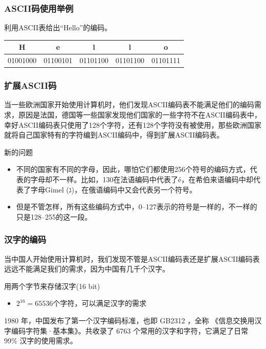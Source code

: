 \begin{frame}[t]
    \frametitle{ASCII码使用举例}
    \begin{question}
        利用ASCII表给出“Hello”的编码。
    \end{question}
    \pause
    \begin{table}
        \centering
        \begin{tabular}{|c|c|c|c|c|}
            \bottomrule
           H & e & l & l & o \\ \hline
           01001000 & 01100101 & 01101100  & 01101100 & 01101111 \\ \toprule
        \end{tabular}
    \end{table}
\end{frame}

\begin{frame}
    \frametitle{扩展ASCII码}
    当一些欧洲国家开始使用计算机时，他们发现ASCII编码表不能满足他们的编码需求，原因是法国，德国等一些国家发现他们国家的一些字符不在ASCII编码表中，幸好ASCII编码表只使用了128个字符，还有128个字符没有被使用，那些欧洲国家就将自己国家特有的字符编到ASCII编码中，得到扩展ASCII编码表。

    \notice 新的问题
    
    \begin{itemize}
      \item 不同的国家有不同的字母，因此，哪怕它们都使用256个符号的编码方式，代表的字母却不一样。比如，130在法语编码中代表了é，在希伯来语编码中却代表了字母Gimel (ג)，在俄语编码中又会代表另一个符号。
      \item 但是不管怎样，所有这些编码方式中，0--127表示的符号是一样的，不一样的只是128--255的这一段。
    \end{itemize}
    
\end{frame}

\begin{frame}
    \frametitle{汉字的编码}
    当中国人开始使用计算机时，我们发现不管是ASCII编码表还是扩展ASCII编码表远远不能满足我们的需求，因为中国有几千个汉字。

    \notice 用两个字节来存储汉字(16 bit)
    \begin{itemize}
      \item $2^{16} = 65536$个字符，可以满足汉字的需求
    \end{itemize}

    1980 年，中国发布了第一个汉字编码标准，也即 GB2312 ，全称 《信息交换用汉字编码字符集·基本集》。共收录了 6763 个常用的汉字和字符，它满足了日常 99\% 汉字的使用需求。
\end{frame}

